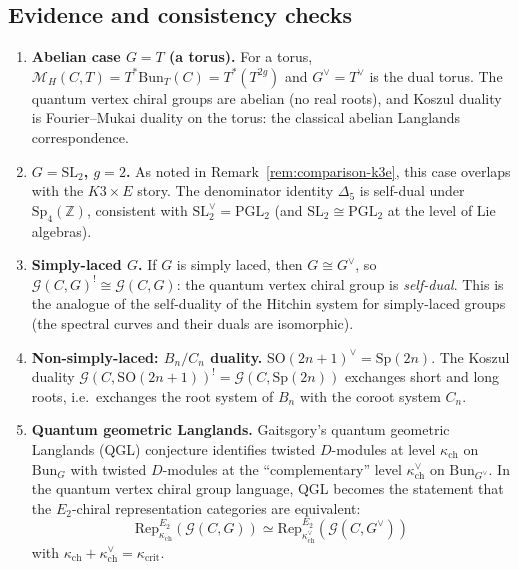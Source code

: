 \documentclass[11pt]{article}
\theoremstyle{definition}
\theoremstyle{remark}
\newcommand{\Bun}{\mathrm{Bun}}
\newcommand{\Rep}{\mathrm{Rep}}
\newcommand{\cM}{\mathcal{M}}
\newcommand{\Etwo}{E_2}
\begin{document}
\subsection{Evidence and consistency checks}

\begin{enumerate}[label=\textbf{(\arabic*)}]
 \item \textbf{Abelian case $G = T$ (a torus).} For a torus, $\cM_H(C, T) = T^*\Bun_T(C) = T^*(T^{2g})$ and $G^\vee = T^\vee$ is the dual torus. The quantum vertex chiral groups are abelian (no real roots), and Koszul duality is Fourier--Mukai duality on the torus: the classical abelian Langlands correspondence.

 \item \textbf{$G = \mathrm{SL}_2$, $g = 2$.} As noted in Remark~\ref{rem:comparison-k3e}, this case overlaps with the $K3 \times E$ story. The denominator identity $\Delta_5$ is self-dual under $\mathrm{Sp}_4(\mathbb{Z})$, consistent with $\mathrm{SL}_2^\vee = \mathrm{PGL}_2$ (and $\mathrm{SL}_2 \cong \mathrm{PGL}_2$ at the level of Lie algebras).

 \item \textbf{Simply-laced $G$.} If $G$ is simply laced, then $G \cong G^\vee$, so $\mathcal{G}(C, G)^! \cong \mathcal{G}(C, G)$: the quantum vertex chiral group is \emph{self-dual}. This is the analogue of the self-duality of the Hitchin system for simply-laced groups (the spectral curves and their duals are isomorphic).

 \item \textbf{Non-simply-laced: $B_n / C_n$ duality.} $\mathrm{SO}(2n+1)^\vee = \mathrm{Sp}(2n)$. The Koszul duality $\mathcal{G}(C, \mathrm{SO}(2n+1))^! = \mathcal{G}(C, \mathrm{Sp}(2n))$ exchanges short and long roots, i.e.\ exchanges the root system of $B_n$ with the coroot system $C_n$.

 \item \textbf{Quantum geometric Langlands.} Gaitsgory's quantum geometric Langlands (QGL) conjecture identifies twisted $D$-modules at level $\kappa_{\mathrm{ch}}$ on $\Bun_G$ with twisted $D$-modules at the ``complementary'' level $\kappa_{\mathrm{ch}}^\vee$ on $\Bun_{G^\vee}$. In the quantum vertex chiral group language, QGL becomes the statement that the $\Etwo$-chiral representation categories are equivalent:
 \[
 \Rep^{\Etwo}_{\kappa_{\mathrm{ch}}}(\mathcal{G}(C, G)) \simeq \Rep^{\Etwo}_{\kappa_{\mathrm{ch}}^\vee}(\mathcal{G}(C, G^\vee))
 \]
 with $\kappa_{\mathrm{ch}} + \kappa_{\mathrm{ch}}^\vee = \kappa_{\mathrm{crit}}$.
\end{enumerate}
\end{document}
